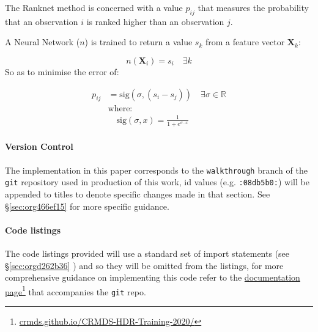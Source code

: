 \documentclass[a4paper,11pt,twoside]{article}
\begin{document}
The Ranknet method is concerned with a value \(p_{ij}\) that
measures the probability that an observation \(i\) is ranked higher
than an observation \(j\).

A Neural Network (\(n\)) is trained to return a value
\(s_k\) from a feature vector \(\mathbf{X}_k\):

 \[n(\mathbf{X}_i) = s_i \quad \exists k\]
So as to minimise the error of:




\begin{align} 
 p_{ij} &= \mathrm{sig}\left(\sigma, (s_i-s_j) \right) \quad \exists \sigma \in \mathbb{R} \\
 &\text{where:} \nonumber \\
 &\quad  \mathrm{sig}\left(\sigma, x\right) = \frac{1}{1+e^{\sigma \cdot x}} 
\end{align} 



\paragraph{Version Control}
\label{sec:org6f630f1}
The implementation in this paper corresponds to the \texttt{walkthrough} branch
of the \texttt{git} repository used in production of this work, id values
(e.g. \texttt{:08db5b0:}) will be appended to titles to denote specific
changes made in that section. See \S \ref{sec:org466ef15} for
more specific guidance.

\paragraph{Code listings}
\label{sec:org5d2fb5b}
The code listings provided will use a standard set of import
statements (see \S \ref{sec:orgd262b36} ) and so they will be
omitted from the listings, for more comprehensive guidance on
implementing this code refer to the \href{https://crmds.github.io/CRMDS-HDR-Training-2020/}{documentation page}\footnote{\href{https://crmds.github.io/CRMDS-HDR-Training-2020/}{crmds.github.io/CRMDS-HDR-Training-2020/}} that
accompanies the \texttt{git} repo.
\end{document}
